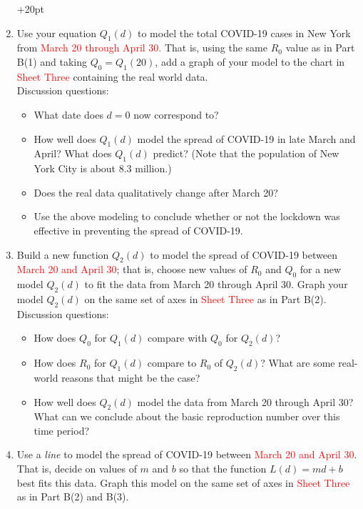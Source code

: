 \documentclass[11pt,reqno,final]{amsart}
\numberwithin{equation}{section}
\numberwithin{figure}{section}
\theoremstyle{definition} %
\begin{document}
\begin{enumerate}[(1)]\setcounter{enumi}{4}\itemsep+20pt
\item Use your equation $Q_1(d)$ to model the total COVID-19 cases in New York from \textcolor{red}{March 20 through April 30.}
        That is, using the same $R_0$ value as in Part B(1) and taking $Q_0 = Q_1(20)$,
        add a graph of your model to the chart in \textcolor{red}{Sheet Three} containing the real world data.\\
        
        Discussion questions:
        \begin{itemize}
        \item What date does $d=0$ now correspond to?
        \item How well does $Q_1(d)$ model the spread of COVID-19 in late March and April? What does $Q_1(d)$ predict? (Note that the population of New York City is about 8.3 million.)
        \item Does the real data qualitatively change after March 20?
        \item Use the above modeling to conclude whether or not the lockdown was effective in preventing the spread of COVID-19.
        \end{itemize}

\item Build a new function $Q_2(d)$ to model the spread of COVID-19 between \textcolor{red}{March 20 and April 30};
        that is, choose new values of $R_0$ and $Q_0$ for a new model $Q_2(d)$ to fit the data from March 20 through April 30.
        Graph your model $Q_2(d)$  
        on the same set of axes in \textcolor{red}{Sheet Three} as in Part B(2).\\
        
        Discussion questions:
        \begin{itemize}
        \item How does $Q_0$ for $Q_1(d)$ compare with $Q_0$ for $Q_2(d)$?
        \item How does $R_0$ for $Q_1(d)$ compare to $R_0$ of $Q_2(d)$? What are some real-world reasons that might be the case?
        \item How well does $Q_2(d)$ model the data from March 20 through April 30? What can we conclude about the basic reproduction number over this time period?
        \end{itemize}
        
\item Use a \textit{line} to model the spread of COVID-19 between \textcolor{red}{March 20 and April 30}.
        That is, decide on values of $m$ and $b$ so that the function $L(d) = md+b$ best fits this data.
        Graph this model on the same set of axes in \textcolor{red}{Sheet Three} as in Part B(2) and B(3).\\
        

\end{enumerate}
\end{document}

